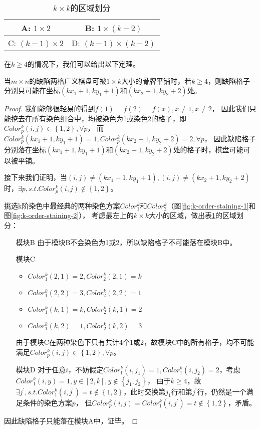 \begin{table}[htb]
	\centering
	\caption{$k \times k$的区域划分}
	\begin{tabular}{|c|c|}
		\hline
		A: $1 \times 2$       & B: $1  \times (k - 2)$     \\
		\hline
		C: $(k - 1) \times 2$ & D: $(k - 1)\times (k - 2)$ \\
		\hline
	\end{tabular}
	\label{fig:k-division}
\end{table}

在$k \ge 4$的情况下，我们可以给出以下定理。
\begin{theorem}
	\label{basic-theorem-3}
	当$m \times n$的缺陷两格广义棋盘可被$1 \times k$大小的骨牌平铺时，若$k \ge 4$，则缺陷格子分别只可能在坐标$(kx_1 + 1, ky_1 + 1)$和$(kx_2 + 1, ky_2 + 2)$处。
\end{theorem}
\begin{proof}
	我们能够很轻易的得到$f(1) = f(2) = f(x), x \neq 1, x \neq 2$，
	因此我们只能挖去在所有染色组合中，均被染色为1或染色2的格子，即$Color^k_p(i, j) \in \left\{1, 2\right\},  \forall p$，
	而$Color^k_p(kx_1 + 1, ky_1 + 1) = 1, Color^k_p(kx_2 + 1, ky_2 + 2) = 2, \forall p$，
	因此缺陷格子分别落在坐标$(kx_1 + 1, ky_1 + 1)$和$(kx_2 + 1, ky_2 + 2)$处的格子时，棋盘可能可以被平铺。

	接下来我们证明，当$(i, j) \neq (kx_1 + 1, ky_1 + 1), (i, j) \neq (kx_2 + 1, ky_2 + 2)$时，$\exists p, s.t. Color^k_p(i, j) \notin \left\{1, 2\right\}$。

	挑选k阶染色中最经典的两种染色方案$Color^k_1$和$Color^k_2$（图\ref{fig:k-order-staining-1}和图\ref{fig:k-order-staining-2}），
	考虑最左上的$k \times k$大小的区域，做出表\ref{fig:k-division}的区域划分：

	\begin{itemize}
		\item[模块B] 由于模块B不会染色为1或2，所以缺陷格子不可能落在模块B中。
		\item[模块C]
			\begin{itemize}
				\item $Color^k_1(2, 1) = 2, Color^k_2(2, 1) = k$
				\item $Color^k_1(2, 2) = 3, Color^k_2(2, 2) = 1$
				\item $Color^k_1(k, 1) = k, Color^k_2(k, 1) = 2$
				\item $Color^k_1(k, 2) = 1, Color^k_2(k, 2) = 3$
			\end{itemize}
			由于模块C在两种染色下只有共计4个1或2，故模块C中的所有格子，均不可能满足$Color^k_p(i, j) \in \left\{1, 2\right\}, \forall p$。
		\item[模块D] 对于任意$i$，不妨假定$Color^k_1(i, j_1) = 1, Color^k_1(i, j_2) = 2$，考虑$Color^k_1(i, y) = 1, y \in [2, k], y \notin \left\{j_1, j_2\right\}$，
			由于$k \ge 4$，故$\exists j^{'}, s.t. Color^k_1(i, j^{'}) = t \notin \left\{1, 2\right\}$，此时交换第$j_1$行和第$j^{'}$行，仍然是一个满足条件的染色方案$p$，
			但$Color^k_p(i, j) = Color^k_1(i, j^{'}) = t \notin \left\{1, 2\right\}$，矛盾。
	\end{itemize}
	因此缺陷格子只能落在模块A中，证毕。
\end{proof}

